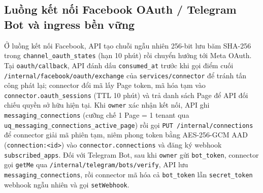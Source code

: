 \subsection{Luồng kết nối Facebook OAuth / Telegram Bot và ingress bền vững}
Ở luồng kết nối Facebook, API tạo chuỗi ngẫu nhiên 256-bit lưu băm SHA-256 trong \texttt{channel\_\hspace{0pt}oauth\_\hspace{0pt}states} (hạn 10 phút) rồi chuyển hướng tới Meta OAuth.
Tại \texttt{oauth/\hspace{0pt}callback}, API đánh dấu \texttt{consumed\_\hspace{0pt}at} trước khi gọi điểm cuối \texttt{/\hspace{0pt}internal/\hspace{0pt}facebook/\hspace{0pt}oauth/\hspace{0pt}exchange} của \texttt{services/\hspace{0pt}connector} để tránh tấn công phát lại; connector đổi mã lấy Page token, mã hóa tạm vào \texttt{connector.\hspace{0pt}oauth\_\hspace{0pt}sessions} (TTL 10 phút) và trả danh sách Page để API đối chiếu quyền sở hữu hiện tại.
Khi \texttt{owner} xác nhận kết nối, API ghi \texttt{messaging\_\hspace{0pt}connections} (cưỡng chế 1 Page = 1 tenant qua \texttt{uq\_\hspace{0pt}messaging\_\hspace{0pt}connections\_\hspace{0pt}active\_\hspace{0pt}page}) rồi gọi \texttt{PUT /\hspace{0pt}internal/\hspace{0pt}connections} để connector giải mã phiên tạm, niêm phong token bằng AES-256-GCM AAD (\texttt{connection:\hspace{0pt}<id>}) vào \texttt{connector.\hspace{0pt}connections} và đăng ký webhook \texttt{subscribed\_\hspace{0pt}apps}.
Đối với Telegram Bot, sau khi \texttt{owner} gửi \texttt{bot\_\hspace{0pt}token}, connector gọi \texttt{getMe} qua \texttt{/\hspace{0pt}internal/\hspace{0pt}telegram/\hspace{0pt}bots/\hspace{0pt}verify}, API lưu \texttt{messaging\_\hspace{0pt}connections}, rồi connector mã hóa cả \texttt{bot\_\hspace{0pt}token} lẫn \texttt{secret\_\hspace{0pt}token} webhook ngẫu nhiên và gọi \texttt{setWebhook}.

